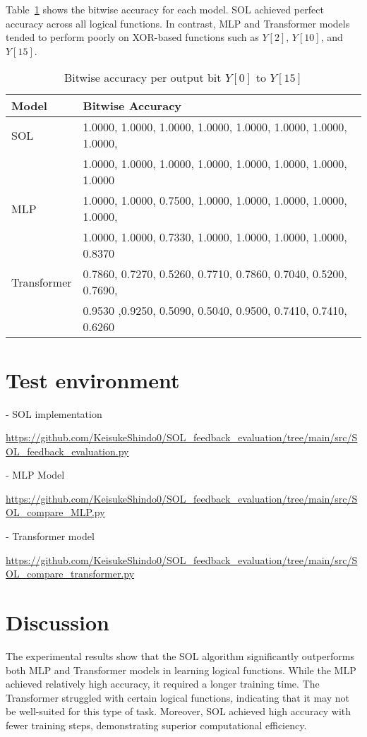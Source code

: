 \documentclass[11pt]{article}
\begin{document}
Table~\ref{fig:bitwise} shows the bitwise accuracy for each model. SOL achieved perfect accuracy across all logical functions. In contrast, MLP and Transformer models tended to perform poorly on XOR-based functions such as $Y[2]$, $Y[10]$, and $Y[15]$.

\begin{table}[H]
\centering
\caption{Bitwise accuracy per output bit $Y[0]$ to $Y[15]$}
\label{fig:bitwise}
\begin{tabular}{ll}
\toprule
\textbf{Model} & \textbf{Bitwise Accuracy} \\
\midrule
SOL & 1.0000, 1.0000, 1.0000, 1.0000, 1.0000, 1.0000, 1.0000, 1.0000, \\
    & 1.0000, 1.0000, 1.0000, 1.0000, 1.0000, 1.0000, 1.0000, 1.0000 \\
MLP & 1.0000, 1.0000, 0.7500, 1.0000, 1.0000, 1.0000, 1.0000, 1.0000, \\
    & 1.0000, 1.0000, 0.7330, 1.0000, 1.0000, 1.0000, 1.0000, 0.8370 \\
Transformer & 0.7860, 0.7270, 0.5260, 0.7710, 0.7860, 0.7040, 0.5200, 0.7690, \\
	& 0.9530 ,0.9250, 0.5090, 0.5040, 0.9500, 0.7410, 0.7410, 0.6260 \\
\bottomrule
\end{tabular}
\end{table}

\section{Test environment}

- SOL implementation 

\url{https://github.com/KeisukeShindo0/SOL_feedback_evaluation/tree/main/src/SOL_feedback_evaluation.py}

- MLP Model  

\url{https://github.com/KeisukeShindo0/SOL_feedback_evaluation/tree/main/src/SOL_compare_MLP.py}

- Transformer model 
 
\url{https://github.com/KeisukeShindo0/SOL_feedback_evaluation/tree/main/src/SOL_compare_transformer.py}

\section{Discussion}
The experimental results show that the SOL algorithm significantly outperforms both MLP and Transformer models in learning logical functions. While the MLP achieved relatively high accuracy, it required a longer training time. The Transformer struggled with certain logical functions, indicating that it may not be well-suited for this type of task. Moreover, SOL achieved high accuracy with fewer training steps, demonstrating superior computational efficiency.
\end{document}
